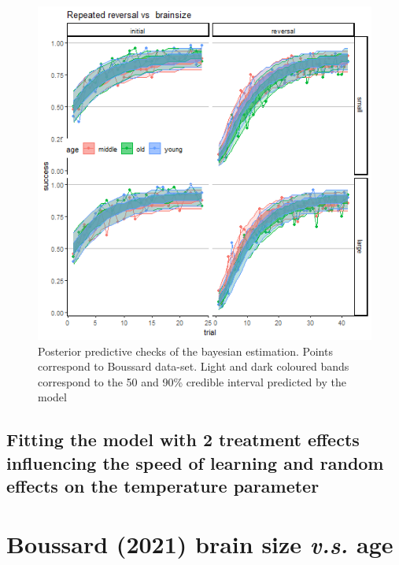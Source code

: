 \documentclass[
]{article}
\begin{document}
\begin{figure}

\includegraphics[width=6.67in,]{images/boussard2_ppchecks_tau_alpha} \hfill{}

\caption{Posterior predictive checks of the bayesian estimation. Points correspond to Boussard data-set. Light and dark coloured bands correspond to the 50 and 90\% credible interval predicted by the model}\label{fig:unnamed-chunk-17}
\end{figure}

\hypertarget{fitting-the-model-with-2-treatment-effects-influencing-the-speed-of-learning-and-random-effects-on-the-temperature-parameter}{%
\subsection{Fitting the model with 2 treatment effects influencing the
speed of learning and random effects on the temperature
parameter}\label{fitting-the-model-with-2-treatment-effects-influencing-the-speed-of-learning-and-random-effects-on-the-temperature-parameter}}

\hypertarget{boussard--boussard_link_2021-brain-size-v.s.-age-3}{%
\section{\texorpdfstring{Boussard (2021) brain size \emph{v.s.}
age}{Boussard (2021) brain size v.s. age}}\label{boussard--boussard_link_2021-brain-size-v.s.-age-3}}
\end{document}
